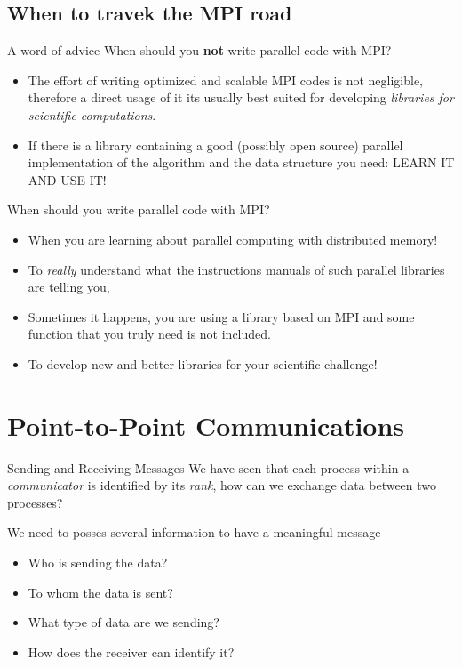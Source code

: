 \documentclass[xcolor={svgnames,usenames}]{beamer}
\begin{document}
\subsection{When to travek the MPI road}
\begin{frame}{A word of advice}
When should you \textbf{not} write parallel code with MPI?
\begin{itemize}
	\item<1-> The effort of writing optimized and scalable MPI codes is not negligible, therefore a direct usage of it its usually best suited for developing \emph{libraries for scientific computations}. 
	\item<2-> If there is a library containing a good (possibly open source) parallel implementation of the algorithm and the data structure you need: LEARN IT AND USE IT!
\end{itemize}
When should you write parallel code with MPI?
\begin{itemize}
	\item<3-> When you are learning about parallel computing with distributed memory!
	\item<4-> To \emph{really} understand what the instructions manuals of such parallel libraries are telling you,
	\item<5-> Sometimes it happens, you are using a library based on MPI and some function that you truly need is not included. 
	\item<6-> To develop new and better libraries for your scientific challenge!
\end{itemize}
\end{frame}

\section{Point-to-Point Communications}

\begin{frame}[fragile]{Sending and Receiving Messages}
We have seen that each process within a \emph{communicator} is identified by its \emph{rank}, how can we \alert{exchange data} between two processes?
\begin{center}
\end{center}
We need to posses several information to have a meaningful message
\begin{itemize}
	\item Who is sending the data?
	\item To whom the data is sent?
	\item What type of data are we sending?
	\item How does the receiver can identify it?
\end{itemize}
\end{frame}
\end{document}
